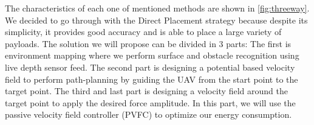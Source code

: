 The characteristics of each one of mentioned methods are shown in \ref{fig:threeway}.
We decided to go through with the Direct Placement strategy because despite its simplicity, it provides good accuracy and is able to place a large variety of payloads. 
The solution we will propose can be divided in 3 parts: The first is environment mapping where we perform surface and obstacle recognition using live depth sensor feed. The second part is designing a potential based velocity field to perform path-planning by guiding the UAV from the start point to the target point. The third and last part is designing a velocity field around the target point to apply the desired force amplitude. In this part, we will use the passive velocity field controller (PVFC) to optimize our energy consumption.

